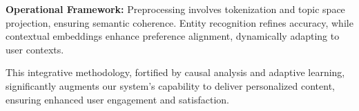 \textbf{Operational Framework:} Preprocessing involves tokenization and topic space projection, ensuring semantic coherence. Entity recognition refines accuracy, while contextual embeddings enhance preference alignment, dynamically adapting to user contexts.

This integrative methodology, fortified by causal analysis and adaptive learning, significantly augments our system's capability to deliver personalized content, ensuring enhanced user engagement and satisfaction.
